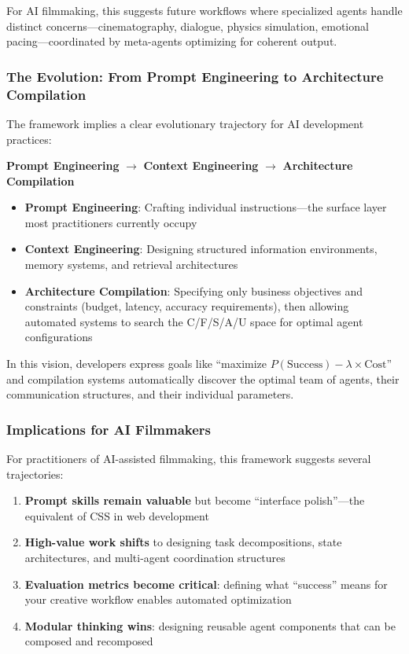 For AI filmmaking, this suggests future workflows where specialized agents handle distinct concerns—cinematography, dialogue, physics simulation, emotional pacing—coordinated by meta-agents optimizing for coherent output.

\subsubsection{The Evolution: From Prompt Engineering to Architecture Compilation}

The framework implies a clear evolutionary trajectory for AI development practices:

\begin{center}
\textbf{Prompt Engineering} $\rightarrow$ \textbf{Context Engineering} $\rightarrow$ \textbf{Architecture Compilation}
\end{center}

\begin{itemize}
\item \textbf{Prompt Engineering}: Crafting individual instructions—the surface layer most practitioners currently occupy
\item \textbf{Context Engineering}: Designing structured information environments, memory systems, and retrieval architectures
\item \textbf{Architecture Compilation}: Specifying only business objectives and constraints (budget, latency, accuracy requirements), then allowing automated systems to search the C/F/S/A/U space for optimal agent configurations
\end{itemize}

In this vision, developers express goals like ``maximize $P(\text{Success}) - \lambda \times \text{Cost}$'' and compilation systems automatically discover the optimal team of agents, their communication structures, and their individual parameters.

\subsubsection{Implications for AI Filmmakers}

For practitioners of AI-assisted filmmaking, this framework suggests several trajectories:

\begin{enumerate}
\item \textbf{Prompt skills remain valuable} but become ``interface polish''—the equivalent of CSS in web development
\item \textbf{High-value work shifts} to designing task decompositions, state architectures, and multi-agent coordination structures
\item \textbf{Evaluation metrics become critical}: defining what ``success'' means for your creative workflow enables automated optimization
\item \textbf{Modular thinking wins}: designing reusable agent components that can be composed and recomposed
\end{enumerate}

